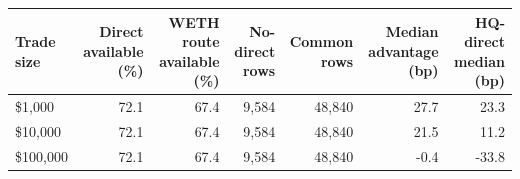 \begin{tabular}{lrrrrrr}
\toprule
Trade size & Direct available (\%) & WETH route available (\%) & No-direct rows & Common rows & Median advantage (bp) & HQ-direct median (bp) \\
\midrule
\$1,000 & 72.1 & 67.4 & 9,584 & 48,840 & 27.7 & 23.3 \\
\$10,000 & 72.1 & 67.4 & 9,584 & 48,840 & 21.5 & 11.2 \\
\$100,000 & 72.1 & 67.4 & 9,584 & 48,840 & -0.4 & -33.8 \\
\bottomrule
\end{tabular}
